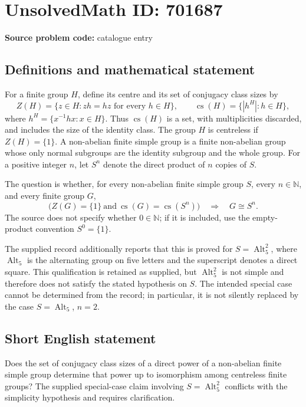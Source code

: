 \documentclass[11pt]{article}
\begin{document}
\section*{UnsolvedMath ID: 701687}
\textbf{Source problem code:} catalogue entry
\subsection{Definitions and mathematical statement}
For a finite group \(H\), define its centre and its set of conjugacy class sizes by
\[
Z(H)=\{z\in H:zh=hz\text{ for every }h\in H\},\qquad
\operatorname{cs}(H)=\{|h^H|:h\in H\},
\]
where \(h^H=\{x^{-1}hx:x\in H\}\). Thus \(\operatorname{cs}(H)\) is a set, with multiplicities discarded, and includes the size of the identity class. The group \(H\) is centreless if \(Z(H)=\{1\}\). A non-abelian finite simple group is a finite non-abelian group whose only normal subgroups are the identity subgroup and the whole group. For a positive integer \(n\), let \(S^n\) denote the direct product of \(n\) copies of \(S\).

The question is whether, for every non-abelian finite simple group \(S\), every \(n\in\mathbb N\), and every finite group \(G\),
\[
\bigl(Z(G)=\{1\}\ \text{and}\ \operatorname{cs}(G)=\operatorname{cs}(S^n)\bigr)
\quad\Longrightarrow\quad G\cong S^n.
\]
The source does not specify whether \(0\in\mathbb N\); if it is included, use the empty-product convention \(S^0=\{1\}\).

The supplied record additionally reports that this is proved for \(S=\operatorname{Alt}_5^2\), where \(\operatorname{Alt}_5\) is the alternating group on five letters and the superscript denotes a direct square. This qualification is retained as supplied, but \(\operatorname{Alt}_5^2\) is not simple and therefore does not satisfy the stated hypothesis on \(S\). The intended special case cannot be determined from the record; in particular, it is not silently replaced by the case \(S=\operatorname{Alt}_5\), \(n=2\).
\subsection{Short English statement}
Does the set of conjugacy class sizes of a direct power of a non-abelian finite simple group determine that power up to isomorphism among centreless finite groups? The supplied special-case claim involving \(S=\operatorname{Alt}_5^2\) conflicts with the simplicity hypothesis and requires clarification.
\end{document}

